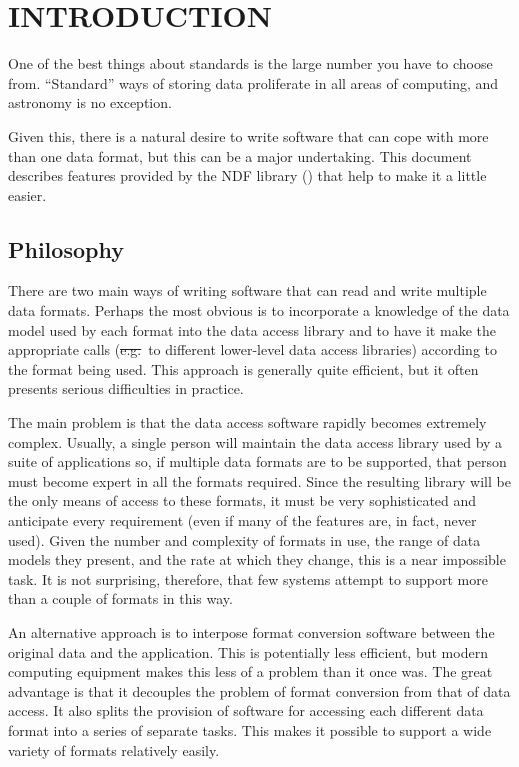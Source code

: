 \section{INTRODUCTION}

One of the best things about standards is the large number you have to
choose from. ``Standard'' ways of storing data proliferate in all
areas of computing, and astronomy is no exception.

Given this, there is a natural desire to write software that can cope
with more than one data format, but this can be a major undertaking.
This document describes features provided by the NDF library
() that help to make it a little easier.

\subsection{Philosophy}

There are two main ways of writing software that can read and write
multiple data formats. Perhaps the most obvious is to incorporate a
knowledge of the data model used by each format into the data access
library and to have it make the appropriate calls (\st{e.g.}\ to
different lower-level data access libraries) according to the format
being used. This approach is generally quite efficient, but it often
presents serious difficulties in practice.

The main problem is that the data access software rapidly becomes
extremely complex.  Usually, a single person will maintain the data
access library used by a suite of applications so, if multiple data
formats are to be supported, that person must become expert in all the
formats required. Since the resulting library will be the only means
of access to these formats, it must be very sophisticated and
anticipate every requirement (even if many of the features are, in
fact, never used). Given the number and complexity of formats in use,
the range of data models they present, and the rate at which they
change, this is a near impossible task. It is not surprising,
therefore, that few systems attempt to support more than a couple of
formats in this way.

An alternative approach is to interpose format conversion software
between the original data and the application. This is potentially
less efficient, but modern computing equipment makes this less of a
problem than it once was. The great advantage is that it decouples the
problem of format conversion from that of data access. It also splits
the provision of software for accessing each different data format
into a series of separate tasks.  This makes it possible to support a
wide variety of formats relatively easily.

